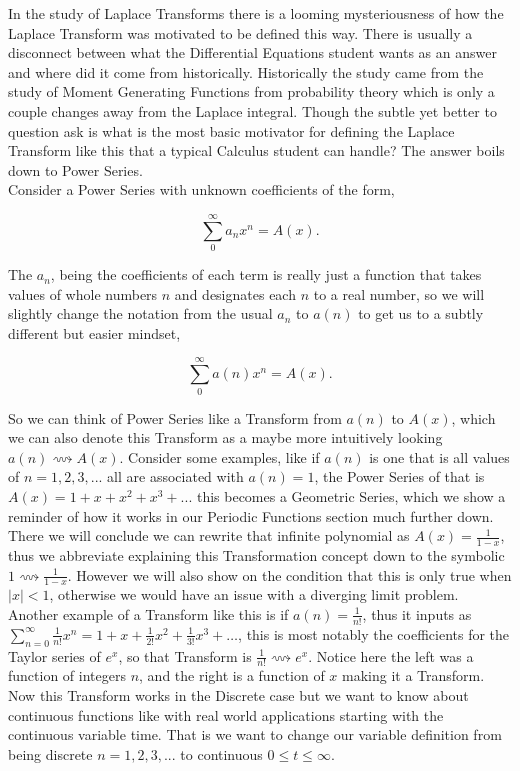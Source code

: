 \documentclass[12pt]{article}
\newcommand{\lrsa}{\longrightsquigarrow}
\begin{document}
In the study of Laplace Transforms there is a looming mysteriousness of how the Laplace Transform was motivated to be defined this way. There is usually a disconnect between what the Differential Equations student wants as an answer and where did it come from historically. Historically the study came from the study of Moment Generating Functions from probability theory which is only a couple changes away from the Laplace integral. Though the subtle yet better to question ask is what is the most basic motivator for defining the Laplace Transform like this that a typical  Calculus student can handle? The answer boils down to Power Series. \\

Consider a Power Series with unknown coefficients of the form, 

\begin{equation*}
    \sum_0^{\infty} a_nx^n = A(x).
\end{equation*}

The $a_n$, being the coefficients of each term is really just a function that takes values of whole numbers $n$ and designates each $n$ to a real number, so we will slightly change the notation from the usual $a_n$ to $a(n)$ to get us to a subtly different but easier mindset,

\begin{equation*}
    \sum_0^{\infty} a(n)x^n = A(x).
\end{equation*}

So we can think of Power Series like a Transform from $a(n)$ to $A(x)$, which we can also denote this Transform as a maybe more intuitively looking $a(n) \lrsa A(x)$. Consider some examples, like if $a(n)$ is one that is all values of $n=1,2,3, ...$ all are associated with $a(n)=1$, the Power Series of that is $A(x)=1+x+x^2+x^3+...$ this becomes a Geometric Series, which we show a reminder of how it works in our Periodic Functions section much further down. There we will conclude we can rewrite that infinite polynomial as $A(x)=\frac{1}{1-x}$, thus we abbreviate explaining this Transformation concept down to the symbolic $1 \lrsa \frac{1}{1-x}$. However we will also show on the condition that this is only true when $|x|<1$, otherwise we would have an issue with a diverging limit problem. \\

Another example of a Transform like this is if $a(n)=\frac{1}{n!}$, thus it inputs as $\sum_{n=0}^{\infty}\frac{1}{n!}x^n = 1+x+\frac{1}{2!}x^2+\frac{1}{3!}x^3+\ldots$, this is most notably the coefficients for the Taylor series of $e^x$, so that Transform is $\frac{1}{n!} \lrsa e^x$. Notice here the left was a function of integers $n$, and the right is a function of $x$ making it a Transform. Now this Transform works in the Discrete case but we want to know about continuous functions like with real world applications starting with the continuous variable time. That is we want to change our variable definition from being discrete $n=1,2,3,...$ to continuous $0 \leq t \leq \infty$. \\
\end{document}
